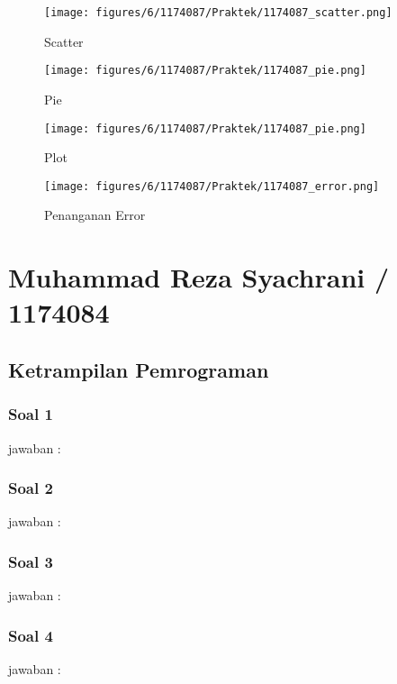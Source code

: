 \begin{figure}[ht]	
    \texttt{[image: figures/6/1174087/Praktek/1174087\_scatter.png]}
    \centering
    \caption{Scatter}
\end{figure}

\begin{figure}[ht]	
    \texttt{[image: figures/6/1174087/Praktek/1174087\_pie.png]}
    \centering
    \caption{Pie}
\end{figure}

\begin{figure}[ht]	
    \texttt{[image: figures/6/1174087/Praktek/1174087\_pie.png]}
    \centering
    \caption{Plot}
\end{figure}

\begin{figure}[ht]	
    \texttt{[image: figures/6/1174087/Praktek/1174087\_error.png]}
    \centering
    \caption{Penanganan Error}
\end{figure}

\section{Muhammad Reza Syachrani / 1174084}
\subsection{Ketrampilan Pemrograman}
\subsubsection{Soal 1}
jawaban : 

\subsubsection{Soal 2}
jawaban : 

\subsubsection{Soal 3}
jawaban : 

\subsubsection{Soal 4}
jawaban : 

